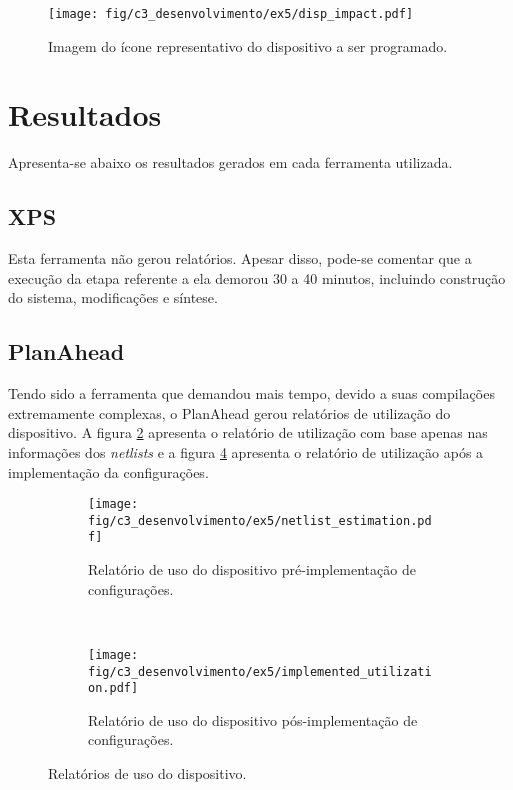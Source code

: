 \documentclass[11pt,a4paper,oneside]{book}
\begin{document}
\begin{figure}[htp]
\centering
\texttt{[image: fig/c3\_desenvolvimento/ex5/disp\_impact.pdf]}
\caption{Imagem do ícone representativo do dispositivo a ser programado.}
\label{fig:exp5:disp_impact}
\end{figure}

\section{Resultados}
Apresenta-se abaixo os resultados gerados em cada ferramenta utilizada.

\subsection{XPS}
Esta ferramenta não gerou relatórios.
Apesar disso, pode-se comentar que a execução da etapa referente a ela demorou 30 a 40 minutos, incluindo construção do sistema, modificações e síntese.

\subsection{PlanAhead}
Tendo sido a ferramenta que demandou mais tempo, devido a suas compilações extremamente complexas, o PlanAhead gerou relatórios de utilização do dispositivo.
A figura \ref{fig:ex5:netlist} apresenta o relatório de utilização com base apenas nas informações dos \textit{netlists} e a figura \ref{fig:ex5:implemented} apresenta o relatório de utilização após a implementação da configurações.

\begin{figure}[htp]
        \centering
        \begin{subfigure}[b]{0.75\textwidth}
		\centering
		\texttt{[image: fig/c3\_desenvolvimento/ex5/netlist\_estimation.pdf]}
		\caption{Relatório de uso do dispositivo pré-implementação de configurações.}
		\label{fig:ex5:netlist}
        \end{subfigure} \\
        \begin{subfigure}[b]{0.75\textwidth}
        		\centering
		\texttt{[image: fig/c3\_desenvolvimento/ex5/implemented\_utilization.pdf]}
		\caption{Relatório de uso do dispositivo pós-implementação de configurações.}
		\label{fig:ex5:implemented}
        \end{subfigure}
        \caption{Relatórios de uso do dispositivo.}
\end{figure}
\end{document}
